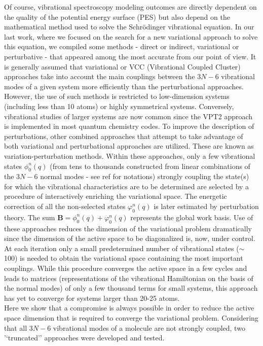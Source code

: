 	Of course, vibrational spectroscopy modeling outcomes are directly dependent on the quality of the potential energy surface (PES) but also depend on the mathematical method used to solve the Schrödinger vibrational equation. In our last work,\cite{garnier2016adaptive} where we focused on the search for a new variational approach to solve this equation, we compiled some methods - direct or indirect, variational or perturbative - that appeared among the most accurate from our point of view. It is generally assumed that variational or VCC (Vibrational Coupled Cluster) approaches take into account the main couplings between the $3N - 6$ vibrational modes of a given system more efficiently than the perturbational approaches. However, the use of such methods is restricted to low-dimension systems (including less than 10 atoms) or highly symmetrical systems. Conversely, vibrational studies of larger systems are now common since the VPT2 approach is implemented in most quantum chemistry codes. To improve the description of perturbations, other combined approaches that attempt to take advantage of both variational and perturbational approaches are utilized. These are known as variation-perturbation methods. Within these approaches, only a few vibrational states $\phi_0^n (q)$ (from tens to thousands constructed from linear combinations of the $3N - 6$ normal modes - see ref\cite{garnier2016adaptive} for notations) strongly coupling the state(s) for which the vibrational characteristics are to be determined are selected by a procedure of interactively enriching the variational space. The energetic correction of all the non-selected states $\varphi_0^n (q)$ is later estimated by perturbation theory. The sum $\textbf{B} = \phi_0^n (q) + \varphi_0^n (q)$ represents the global work basis. Use of these approaches reduces the dimension of the variational problem dramatically\cite{baraille2001calculation,scribano2008iterative} since the dimension of the active space to be diagonalized is, now, under control. At each iteration only a small predetermined number of vibrational states ($\sim$ 100) is needed to obtain the variational space containing the most important couplings. While this procedure converges the active space in a few cycles and leads to matrices (representations of the vibrational Hamiltonian on the basis of the normal modes) of only a few thousand terms for small systems, this approach has yet to converge for systems larger than 20-25 atoms.\\
	
	 Here we show that a compromise is always possible in order to reduce the active space dimension that is required to converge the variational problem. Considering that all $3N-6$ vibrational modes of a molecule are not strongly coupled, two '‘truncated’' approaches were developed and tested.\\
	
